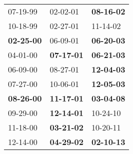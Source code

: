 \begin{supertabular}{p{0.33\columnwidth}p{0.33\columnwidth}p{0.33\columnwidth}}
          07-19-99\textsuperscript{} &           02-02-01\textsuperscript{} &  \textbf{08-16-02\textsuperscript{}} \\
          10-18-99\textsuperscript{} &           02-27-01\textsuperscript{} &           11-14-02\textsuperscript{} \\
 \textbf{02-25-00\textsuperscript{}} &           06-09-01\textsuperscript{} &  \textbf{06-20-03\textsuperscript{}} \\
          04-01-00\textsuperscript{} &  \textbf{07-17-01\textsuperscript{}} &  \textbf{06-21-03\textsuperscript{}} \\
          06-09-00\textsuperscript{} &           08-27-01\textsuperscript{} &  \textbf{12-04-03\textsuperscript{}} \\
          07-27-00\textsuperscript{} &           10-06-01\textsuperscript{} &  \textbf{12-05-03\textsuperscript{}} \\
 \textbf{08-26-00\textsuperscript{}} &  \textbf{11-17-01\textsuperscript{}} &  \textbf{03-04-08\textsuperscript{}} \\
          09-29-00\textsuperscript{} &  \textbf{12-14-01\textsuperscript{}} &           10-24-10\textsuperscript{} \\
          11-18-00\textsuperscript{} &  \textbf{03-21-02\textsuperscript{}} &           10-20-11\textsuperscript{} \\
          12-14-00\textsuperscript{} &  \textbf{04-29-02\textsuperscript{}} &  \textbf{02-10-13\textsuperscript{}} \\
\end{supertabular}
